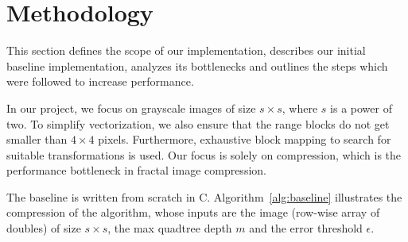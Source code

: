 \section{Methodology}\label{sec:yourmethod}

This section defines the scope of our implementation, describes our initial baseline
implementation, analyzes its bottlenecks and outlines the steps which were followed to
increase performance.

 In our project, we focus on grayscale images of size $s \times s$,
where $s$ is a power of two. To simplify vectorization, we
also ensure that the range blocks do not get smaller than $4 \times 4$ pixels.
Furthermore, exhaustive block mapping to search for suitable transformations is
used. Our focus is solely on compression, which is the performance bottleneck in
fractal image compression.


The baseline is written from scratch in C. Algorithm~\ref{alg:baseline} illustrates the compression of the algorithm,
whose inputs are the image (row-wise array of doubles) of size $s \times s$, the max quadtree depth $m$ and the error threshold $\epsilon$.

